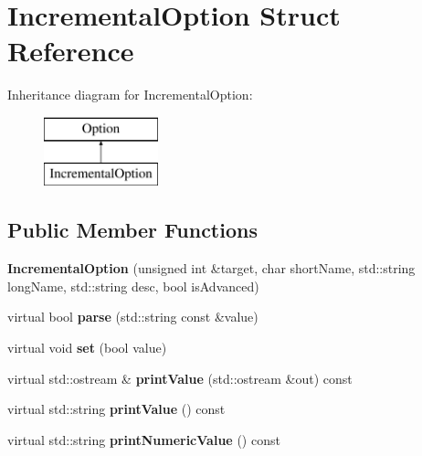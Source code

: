 \hypertarget{structIncrementalOption}{}\section{Incremental\+Option Struct Reference}
\label{structIncrementalOption}
Inheritance diagram for Incremental\+Option\+:\begin{figure}[H]
\begin{center}
\leavevmode
\includegraphics[height=2.000000cm]{structIncrementalOption}
\end{center}
\end{figure}
\subsection*{Public Member Functions}
\begin{DoxyCompactItemize}
\item 
\mbox{\label{structIncrementalOption_a154af0f71dbb1ff4f6b8ece8d6013b14}} 
{\bfseries Incremental\+Option} (unsigned int \&target, char short\+Name, std\+::string long\+Name, std\+::string desc, bool is\+Advanced)
\item 
\mbox{\label{structIncrementalOption_adb6503f055c993759228735b098f9576}} 
virtual bool {\bfseries parse} (std\+::string const \&value)
\item 
\mbox{\label{structIncrementalOption_ada909c5d0ee1f4d5f6734a990a17e01d}} 
virtual void {\bfseries set} (bool value)
\item 
\mbox{\label{structIncrementalOption_a4bf046d6d279f690b920fd702dbe8c6d}} 
virtual std\+::ostream \& {\bfseries print\+Value} (std\+::ostream \&out) const
\item 
\mbox{\label{structIncrementalOption_ac6ec279a47d27a316c03b1dece2b0e3f}} 
virtual std\+::string {\bfseries print\+Value} () const
\item 
\mbox{\label{structIncrementalOption_a2ed826a81e173edd4ed6f3979fd3a7b4}} 
virtual std\+::string {\bfseries print\+Numeric\+Value} () const
\end{DoxyCompactItemize}
